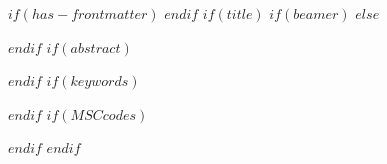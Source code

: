 $if(has-frontmatter)$
\frontmatter
$endif$
$if(title)$
$if(beamer)$
\frame{\titlepage}
$else$
\maketitle
$endif$
$if(abstract)$
\begin{abstract}
$abstract$
\end{abstract}
$endif$
$if(keywords)$
$endif$
$if(MSCcodes)$
$endif$
$endif$


